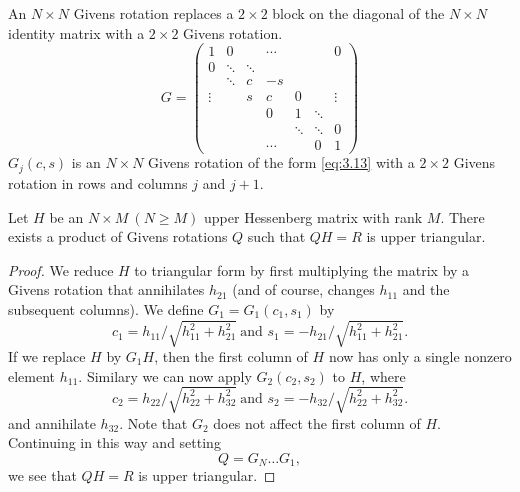 \begin{defi}
  An $N\times N$ Givens rotation replaces a $2\times 2$ block on the
  diagonal of the $N\times N$ identity matrix with a $2\times 2$
  Givens rotation.
  \begin{equation}
    \label{eq:3.13}
    G=\left(
      \begin{array}{ccccccc}
        1 &0 & &\cdots & & & 0\\
        0 &\ddots &\ddots & & & & \\
          & \ddots& c&-s & & & \\
         \vdots & &s &c &0 & & \vdots\\
          & & & 0&1 &\ddots & \\
          & & & &\ddots &\ddots &0 \\
         & & &\cdots & &0 &1 
      \end{array}
    \right)
  \end{equation}
  $G_{j}(c,s)$ is an $N\times N$ Givens rotation of the form
  \eqref{eq:3.13} with a $2\times 2$ Givens rotation in rows and
  columns $j$ and $j+1$.
\end{defi}

\begin{lemma}
  Let $H$ be an $N\times M\ (N\geq M)$ upper Hessenberg matrix with
  rank $M$. There exists a product of Givens rotations $Q$ such that
  $QH=R$ is upper triangular.
\end{lemma}

\begin{proof}
  We reduce $H$ to triangular form by first multiplying the matrix by
  a Givens rotation that annihilates $h_{21}$ (and of course, changes
  $h_{11}$ and the subsequent columns). We define $G_1=G_1(c_1,s_1)$
  by
  \begin{equation}
    \label{eq:3.14}
    c_1=h_{11}/\sqrt{h_{11}^2+h_{21}^2}\ \text{and } s_1=-h_{21}/\sqrt{h_{11}^2+h_{21}^2}.
  \end{equation}
  If we replace $H$ by $G_1H$, then the first column of $H$ now has
  only a single nonzero element $h_{11}$. Similary we can now apply
  $G_2(c_2,s_2)$ to $H$, where
  \begin{equation}
    \label{eq:3.15}
    c_2=h_{22}/\sqrt{h_{22}^2+h_{32}^2}\ \text{and } s_2=-h_{32}/\sqrt{h_{22}^2+h_{32}^2}.
  \end{equation}
  and annihilate $h_{32}$. Note that $G_2$ does not affect the first
  column of $H$. Continuing in this way and setting $$Q=G_N\ldots
  G_1,$$
  we see that $QH=R$ is upper triangular.
\end{proof}

